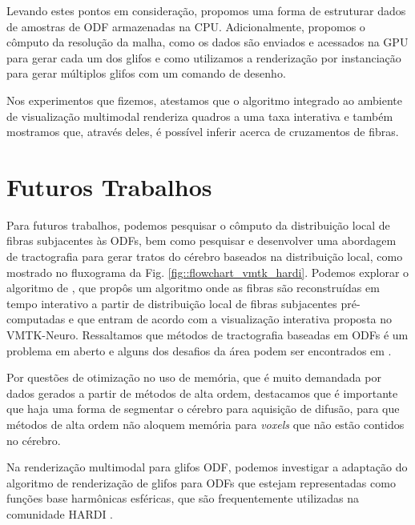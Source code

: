 \documentclass[
    12pt,                %
    oneside,            %
    a4paper,            %
    english,            %
    french,                %
    spanish,            %
    brazil                %
    ]{abntex2}
\begin{document}
Levando estes pontos em consideração, propomos uma forma de estruturar dados de amostras de ODF armazenadas na CPU. Adicionalmente, propomos o cômputo da resolução da malha, como os dados são enviados e acessados na GPU para gerar cada um dos glifos e como utilizamos a renderização por instanciação para gerar múltiplos glifos com um comando de desenho.

Nos experimentos que fizemos, atestamos que o algoritmo integrado ao ambiente de visualização multimodal renderiza quadros a uma taxa interativa e também mostramos que, através deles, é possível inferir acerca de cruzamentos de fibras.

\section{Futuros Trabalhos}

Para futuros trabalhos, podemos pesquisar o cômputo da distribuição local de fibras subjacentes às ODFs, bem como pesquisar e desenvolver uma abordagem de tractografia para gerar tratos do cérebro baseados na distribuição local, como mostrado no fluxograma da Fig. \ref{fig::flowchart_vmtk_hardi}. Podemos explorar o algoritmo de , que propôs um algoritmo onde as fibras são reconstruídas em tempo interativo a partir de distribuição local de fibras subjacentes pré-computadas e que entram de acordo com a visualização interativa proposta no VMTK-Neuro. Ressaltamos que métodos de tractografia baseadas em ODFs é um problema em aberto e alguns dos desafios da área podem ser encontrados em .

Por questões de otimização no uso de memória, que é muito demandada por dados gerados a partir de métodos de alta ordem, destacamos que é importante que haja uma forma de segmentar o cérebro para aquisição de difusão, para que métodos de alta ordem não aloquem memória para \textit{voxels} que não estão contidos no cérebro.


Na renderização multimodal para glifos ODF, podemos investigar a adaptação do algoritmo de renderização de glifos para ODFs que estejam representadas como funções base harmônicas esféricas, que são frequentemente utilizadas na comunidade HARDI \cite{descoteaux2007_QBI, Tournier2004DirectEO, tournier2007}.


\end{document}
